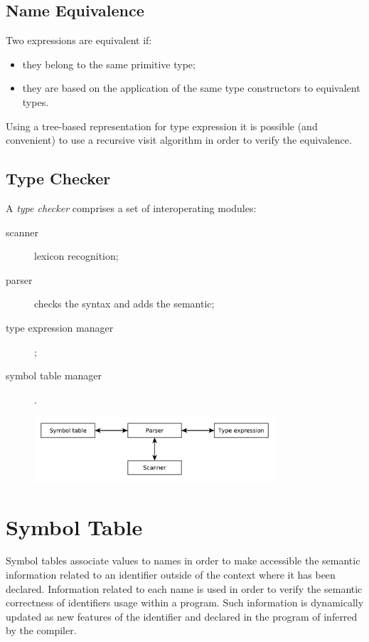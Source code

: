 \subsection{Name Equivalence}
Two expressions are equivalent if:
\begin{itemize}
    \item
    they belong to the same primitive type;
    \item
    they are based on the application of the same type constructors to equivalent types.
\end{itemize}

Using a tree-based representation for type expression it is possible (and convenient) to use a recursive visit algorithm in order to verify the equivalence.

\subsection{Type Checker}
A \emph{type checker} comprises a set of interoperating modules:
\begin{description}
    \item[scanner]
    lexicon recognition;
    \item[parser]
    checks the syntax and adds the semantic;
    \item[type expression manager];
    \item[symbol table manager].
\end{description}
\begin{figure}[H]
    \centerline{\includegraphics[width=0.8\textwidth]{img/39.pdf}}
\end{figure}

\section{Symbol Table}
Symbol tables associate values to names in order to make accessible the semantic information related to an identifier outside of the context where it has been declared.
Information related to each name is used in order to verify the semantic correctness of identifiers usage within a program.
Such information is dynamically updated as new features of the identifier and declared in the program of inferred by the compiler.

